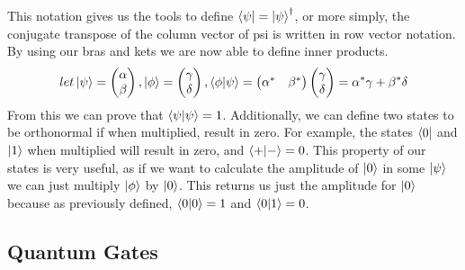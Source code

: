 \documentclass{article}
\begin{document}
This notation gives us the tools to define $\bra{\psi} = \ket{\psi}^{\dagger}$, or more simply, the conjugate transpose of the column vector of psi is written in row vector notation. By using our bras and kets we are now able to define inner products. 
\[
    let \ket{\psi}=
    \begin{pmatrix}
        \alpha\\
        \beta
    \end{pmatrix},
    \ket{\phi}=
    \begin{pmatrix}
        \gamma\\
        \delta
    \end{pmatrix},
    \bra{\phi}\ket{\psi} = 
    \begin{pmatrix} 
        \alpha^* & \beta^*
    \end{pmatrix}
     \begin{pmatrix}
        \gamma\\
        \delta
    \end{pmatrix}
    = \alpha^*\gamma+\beta^*\delta
\]
From this we can prove that $\bra{\psi}\ket{\psi} = 1$. Additionally, we can define two states to be orthonormal if when multiplied, result in zero. For example, the states $\bra{0}$ and $\ket{1}$ when multiplied will result in zero, and $\bra{+}\ket{-}=0$. This property of our states is very useful, as if we want to calculate the amplitude of $\ket{0}$ in some $\ket{\psi}$ we can just multiply $\ket{\phi}$ by $\ket{0}$. This returns us just the amplitude for $\ket{0}$ because as previously defined, $\bra{0}\ket{0}=1$ and $\bra{0}\ket{1}=0$.

\subsection{Quantum Gates}
\end{document}
